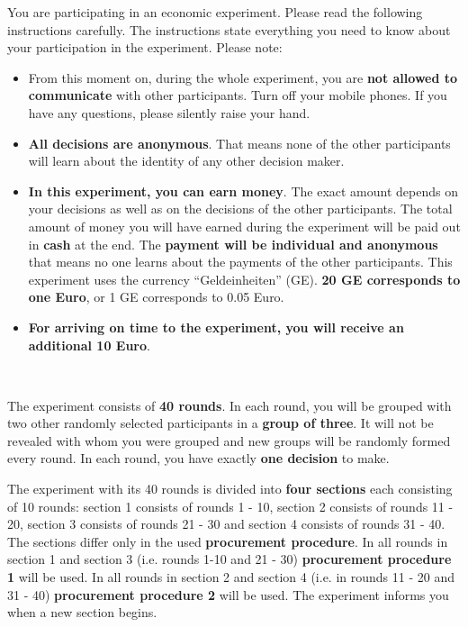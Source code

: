 \documentclass[11pt]{article}
\begin{document}
	


You are participating in an economic experiment. Please read the following instructions carefully. The instructions state everything you need to know about your participation in the experiment. \bigbreak
Please note:
\begin{itemize}
	\item From this moment on, during the whole experiment, you are \textbf{not allowed to communicate} with other participants. Turn off your mobile phones. If you have any questions, please silently raise your hand.
	\item \textbf{All decisions are anonymous}. That means none of the other participants will learn about the identity of any other decision maker.
	\item \textbf{In this experiment, you can earn money}. The exact amount depends on your decisions as well as on the decisions of the other participants. The total amount of money you will have earned during the experiment will be paid out in \textbf{cash} at the end. The \textbf{payment will be individual and anonymous} that means no one learns about the payments of the other participants. This experiment uses the currency \enquote{Geldeinheiten} (GE). \textbf{20 GE corresponds to one Euro}, or 1 GE corresponds to 0.05 Euro.
	\item \textbf{For arriving on time to the experiment, you will receive an additional 10 Euro}.
\end{itemize}

~\par
		

The experiment consists of \textbf{40 rounds}. In each round, you will be grouped with two other randomly selected participants in a \textbf{group of three}. It will not be revealed with whom you were grouped and new groups will be randomly formed every round. In each round, you have exactly \textbf{one decision} to make.



The experiment with its 40 rounds is divided into \textbf{four sections} each consisting of 10 rounds: section 1 consists of rounds 1 - 10, section 2 consists of rounds 11 - 20, section 3 consists of rounds 21 - 30 and section 4 consists of rounds 31 - 40. ~\bigbreak
The sections differ only in the used \textbf{procurement procedure}. In all rounds in section 1 and section 3 (i.e. rounds 1-10 and 21 - 30) \textbf{procurement procedure 1} will be used. In all rounds in section 2 and section 4 (i.e. in rounds 11 - 20 and 31 - 40) \textbf{procurement procedure 2} will be used. The experiment informs you when a new section begins.
\end{document}
